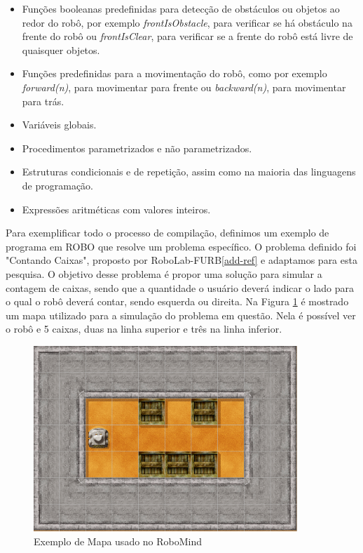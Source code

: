 \begin{itemize}
    \item Funções booleanas predefinidas para detecção de obstáculos ou objetos ao redor do robô, por exemplo \textit{frontIsObstacle}, para verificar se há obstáculo na frente do robô ou \textit{frontIsClear}, para verificar se a frente do robô está livre de quaisquer objetos.
    \item Funções predefinidas para a movimentação do robô, como por exemplo \textit{forward(n)}, para movimentar para frente ou \textit{backward(n)}, para movimentar para trás.
    \item Variáveis globais.
    \item Procedimentos parametrizados e não parametrizados.
    \item Estruturas condicionais e de repetição, assim como na maioria das linguagens de programação.
    \item Expressões aritméticas com valores inteiros.
\end{itemize}

Para exemplificar todo o processo de compilação, definimos um exemplo de programa em ROBO que resolve um problema específico. O problema definido foi "Contando Caixas", proposto por RoboLab-FURB\ref{add-ref} e adaptamos para esta pesquisa. O objetivo desse problema é propor uma solução para simular a contagem de caixas, sendo que a quantidade o usuário deverá indicar o lado para o qual o robô deverá contar, sendo esquerda ou direita. Na Figura \ref{fig:map} é mostrado um mapa utilizado para a simulação do problema em questão. Nela é possível ver o robô e 5 caixas, duas na linha superior e três na linha inferior.

\begin{figure}[h]
\centering
\includegraphics[height=7cm]{figuras/map.png}
\caption{Exemplo de Mapa usado no RoboMind}
\label{fig:map}
\end{figure}

